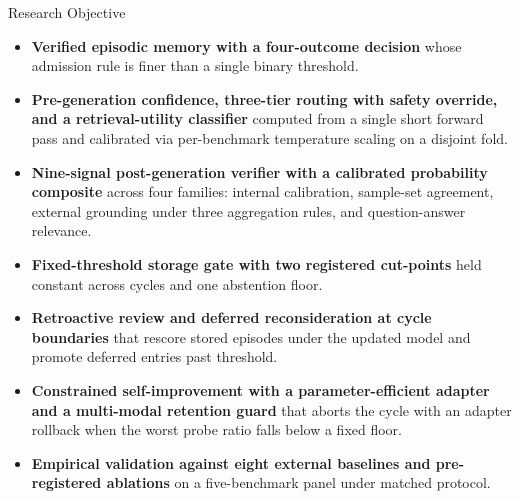 \documentclass[final]{beamer}
\newlength{\colwidth}
\begin{document}
\begin{frame}[t]
\begin{columns}[t]
\begin{column}{\colwidth}
  \begin{block}{Research Objective}
    \begin{itemize}
      \item \textbf{Verified episodic memory with a four-outcome decision}
        whose admission rule is finer than a single binary threshold.
      \item \textbf{Pre-generation confidence, three-tier routing with
        safety override, and a retrieval-utility classifier} computed
        from a single short forward pass and calibrated via per-benchmark
        temperature scaling on a disjoint fold.
      \item \textbf{Nine-signal post-generation verifier with a calibrated
        probability composite} across four families: internal calibration,
        sample-set agreement, external grounding under three aggregation
        rules, and question-answer relevance.
      \item \textbf{Fixed-threshold storage gate with two registered
        cut-points} held constant across cycles and one abstention floor.
      \item \textbf{Retroactive review and deferred reconsideration at
        cycle boundaries} that rescore stored episodes under the updated
        model and promote deferred entries past threshold.
      \item \textbf{Constrained self-improvement with a parameter-efficient
        adapter and a multi-modal retention guard} that aborts the cycle
        with an adapter rollback when the worst probe ratio falls below a
        fixed floor.
      \item \textbf{Empirical validation against eight external baselines
        and pre-registered ablations} on a five-benchmark panel under
        matched protocol.
    \end{itemize}
  \end{block}


\end{column}
\end{columns}
\end{frame}
\end{document}
